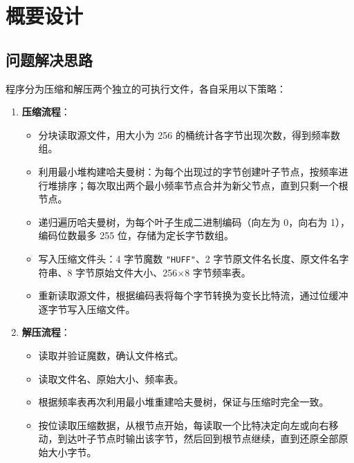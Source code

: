\documentclass[UTF8]{ctexart}
\begin{document}
\section{概要设计}

\subsection{问题解决思路}
程序分为压缩和解压两个独立的可执行文件，各自采用以下策略：
\begin{enumerate}
    \item \textbf{压缩流程}：
        \begin{itemize}
            \item 分块读取源文件，用大小为 256 的桶统计各字节出现次数，得到频率数组。
            \item 利用最小堆构建哈夫曼树：为每个出现过的字节创建叶子节点，按频率进行堆排序；每次取出两个最小频率节点合并为新父节点，直到只剩一个根节点。
            \item 递归遍历哈夫曼树，为每个叶子生成二进制编码（向左为 0，向右为 1），编码位数最多 255 位，存储为定长字节数组。
            \item 写入压缩文件头：4 字节魔数 \texttt{"HUFF"}、2 字节原文件名长度、原文件名字符串、8 字节原始文件大小、256×8 字节频率表。
            \item 重新读取源文件，根据编码表将每个字节转换为变长比特流，通过位缓冲逐字节写入压缩文件。
        \end{itemize}
    \item \textbf{解压流程}：
        \begin{itemize}
            \item 读取并验证魔数，确认文件格式。
            \item 读取文件名、原始大小、频率表。
            \item 根据频率表再次利用最小堆重建哈夫曼树，保证与压缩时完全一致。
            \item 按位读取压缩数据，从根节点开始，每读取一个比特决定向左或向右移动，到达叶子节点时输出该字节，然后回到根节点继续，直到还原全部原始大小字节。
        \end{itemize}
\end{enumerate}
\end{document}
